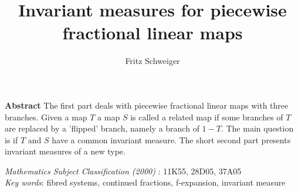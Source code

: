 \documentclass[12pt]{article}
\begin{document}
	
	\title{Invariant measures for piecewise fractional linear maps}
	\author{Fritz Schweiger}
	
	\date{}
	\maketitle
	
	\vskip 30pt
	{\bf Abstract}
	\noindent 
	The first part deals with piecewise fractional linear maps with three branches. Given a map $T$  a map $S$ is called  a related map if some branches of $T$ are replaced by a 'flipped' branch, namely a branch of $1-T$. The main question is if $T$ and $S$ have a common invariant measure. The short second part presents invariant measures of a new type.
	
	
	\noindent
	{\em Mathematics Subject Classification (2000)} : 11K55, 28D05, 37A05\\
	{\em Key words}: fibred systems, continued fractions, f-expansion, invariant measure\\
	
\end{document}
